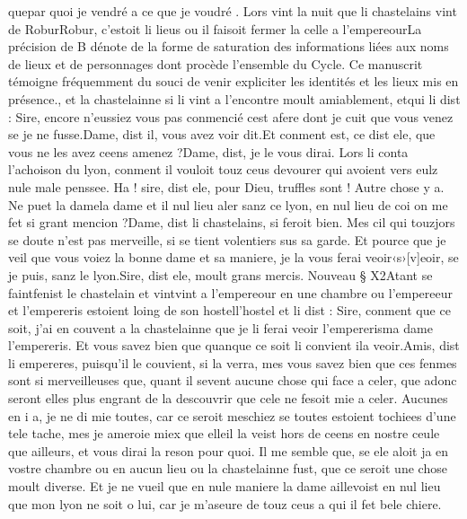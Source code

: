 \documentclass{article}
\begin{document}
\begin{pages}
      quepar quoi je vendré a ce que je voudré
         . \pend
\pstart Lors vint la nuit que li chastelains vint de 
   RoburRobur, c'estoit li lieus ou il faisoit
   fermer la celle a l'empereourLa précision de B dénote de la forme de saturation des informations 
   liées aux noms de lieux et de personnages dont procède l'ensemble du Cycle. Ce manuscrit témoigne fréquemment du souci de venir expliciter 
   les identités et les lieux mis en présence., et la chastelainne si li vint a l’encontre 
   moult amiablement, etqui li dist :
   Sire, encore n’eussiez vous pas conmencié cest afere dont je cuit que vous venez se je ne fusse.Dame, dist il, vous avez voir dit.Et conment est, ce dist ele, que vous ne les avez ceens amenez ?Dame, dist, je le vous dirai.
   Lors li conta l’achoison du lyon, 
      conment il vouloit touz ceus devourer qui avoient vers eulz nule male penssee.
   Ha ! sire, dist ele, pour Dieu, truffles sont ! Autre chose y a. 
      Ne puet la damela dame et il 
      nul lieu aler sanz ce lyon, 
      en nul lieu de coi on me fet si grant mencion ?Dame, dist li chastelains, si feroit bien. 
   Mes cil qui touzjors se doute n’est pas merveille, si se tient volentiers sus sa garde. 
   Et pource que je veil que vous voiez la bonne dame et sa maniere, 
      je la vous ferai veoir‹s›[v]eoir, se je puis, sanz le lyon.Sire, dist ele, moult grans mercis.
   Nouveau § X2Atant se faintfenist 
   le chastelain et vintvint a l'empereour 
   en une chambre ou l’empereeur
      et l’empereris estoient loing de 
   son hostell'hostel et li dist :
   Sire, conment que ce soit, j’ai en couvent a la chastelainne 
      que je li ferai veoir 
      l’empererisma dame l'empereris. 
      Et vous savez bien que quanque ce soit li convient 
      ila veoir.Amis, dist li empereres, puisqu’il le couvient, si la verra,
      mes vous savez bien que ces fenmes sont si merveilleuses que, quant il sevent aucune chose qui face 
         a celer, que adonc seront elles plus engrant de la descouvrir que cele ne fesoit mie a celer. 
         Aucunes en i a, je ne di mie 
         toutes, car ce seroit meschiez se toutes estoient tochiees d’une tele tache, 
         mes je ameroie miex que 
      elleil la veist hors de ceens 
   en nostre ceule que ailleurs, et vous dirai la reson pour quoi. Il me semble que, se ele aloit ja en 
      vostre chambre ou en aucun lieu ou la chastelainne fust, que ce seroit une chose moult 
      diverse. Et je ne vueil que en nule maniere la dame 
      aillevoist en nul lieu 
      que mon lyon ne soit o lui, car je m’aseure de touz ceus a qui il fet bele chiere.

\end{pages}
\end{document}
